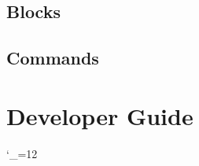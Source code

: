 \documentclass[a4paper,notitlepage]{refrep}
\begin{document}
\section{Blocks}


\section{Commands}






\chapter{Developer Guide\label{Developer_Guide}}



\nocite{*}

{\small}

\begingroup \catcode`_=12 %
\printindex
\endgroup
\end{document}
